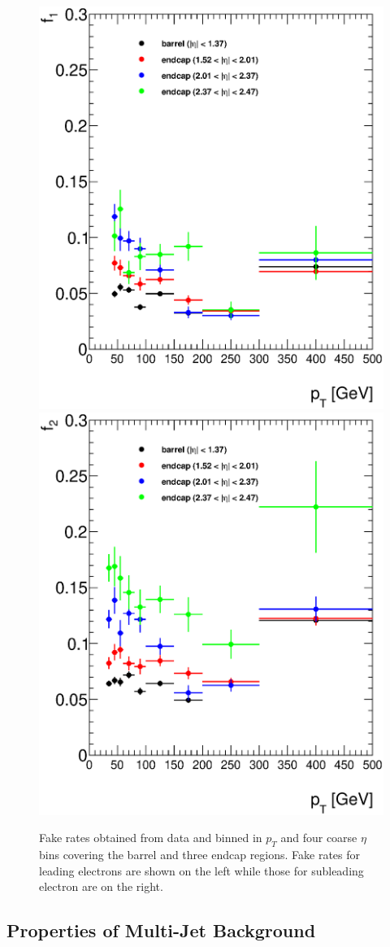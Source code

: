    \begin{figure}[h]
      \begin{center}
      \includegraphics[width=0.48\linewidth]{images/f1.eps}
      \includegraphics[width=0.48\linewidth]{images/f2.eps}
      \end{center}
   \caption{Fake rates obtained from data and binned in $p_{T}$ and four coarse $\eta$ bins covering the barrel and three endcap regions. Fake rates for leading electrons are shown on the left while those for subleading electron are on the right.}
   \label{fig:fakeRates}
   \end{figure}




\subsection{Properties of Multi-Jet Background}

